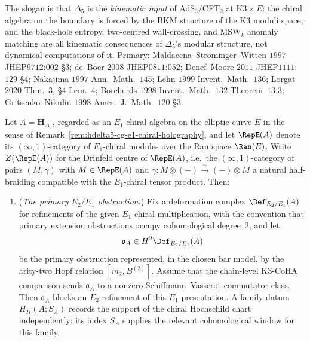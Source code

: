 \begin{remark}
The slogan is that $\Delta_5$ is the \emph{kinematic input} of
AdS$_3$/CFT$_2$ at $\mathrm{K3}\times E$: the chiral algebra on the
boundary is forced by the BKM structure of the K3 moduli space, and
the black-hole entropy, two-centred wall-crossing, and
$\mathrm{MSW}_k$ anomaly matching are all kinematic consequences of
$\Delta_5$'s modular structure, not dynamical computations of it.
Primary:
Maldacena--Strominger--Witten $1997$ JHEP$9712$:$002$ \S$3$;
de~Boer $2008$ JHEP$0811$:$052$;
Denef--Moore $2011$ JHEP$1111$:$129$ \S$4$;
Nakajima $1997$ Ann.\ Math.\ $145$; Lehn $1999$ Invent.\ Math.\ $136$;
Lorgat $2020$ Thm.\ $3$, \S$4$ Lem.\ $4$;
Borcherds $1998$ Invent.\ Math.\ $132$ Theorem~$13.3$;
Gritsenko--Nikulin $1998$ Amer.\ J.\ Math.\ $120$ \S$3$.
\end{remark}

\begin{proposition}
\label{prop:hochcalc-e2-chiral-drinfeld-centre-hdelta5-delta10}
Let $A=\mathbf H_{\Delta_5}$, regarded as an $E_1$-chiral algebra on the
elliptic curve $E$ in the sense of
Remark~\ref{rem:hdelta5-cg-e1-chiral-holography}, and let
$\RepE(A)$ denote its $(\infty,1)$-category of $E_1$-chiral modules over
the Ran space $\Ran(E)$. Write $Z(\RepE(A))$ for the Drinfeld centre
of $\RepE(A)$, i.e.\ the $(\infty,1)$-category of pairs
$(M,\gamma)$ with $M\in\RepE(A)$ and $\gamma\colon M\otimes(-)\xrightarrow\sim(-)\otimes M$
a natural half-braiding compatible with the $E_1$-chiral tensor product.
Then:
\begin{enumerate}[label=(\alph*),leftmargin=1.6em]
 \item (\emph{The primary $E_2/E_1$ obstruction.}) Fix a deformation
 complex $\Def_{E_2/E_1}(A)$ for refinements of the given $E_1$-chiral
 multiplication, with the convention that primary extension
 obstructions occupy cohomological degree~$2$, and let
 \[
 \mathfrak o_A\in H^2\Def_{E_2/E_1}(A)
 \]
 be the primary obstruction represented, in the chosen bar model, by
 the arity-two Hopf relation $[m_2,B^{(2)}]$. Assume that the
 chain-level K3-CoHA comparison sends $\mathfrak o_A$ to a nonzero
 Schiffmann--Vasserot commutator class. Then $\mathfrak o_A$ blocks an
 $E_2$-refinement of this $E_1$ presentation. A family datum
 $H_H(A;S_A)$ records the support of the chiral Hochschild
 chart independently; its index $S_A$ supplies the relevant
 cohomological window for this family.

\end{enumerate}
\end{proposition}
